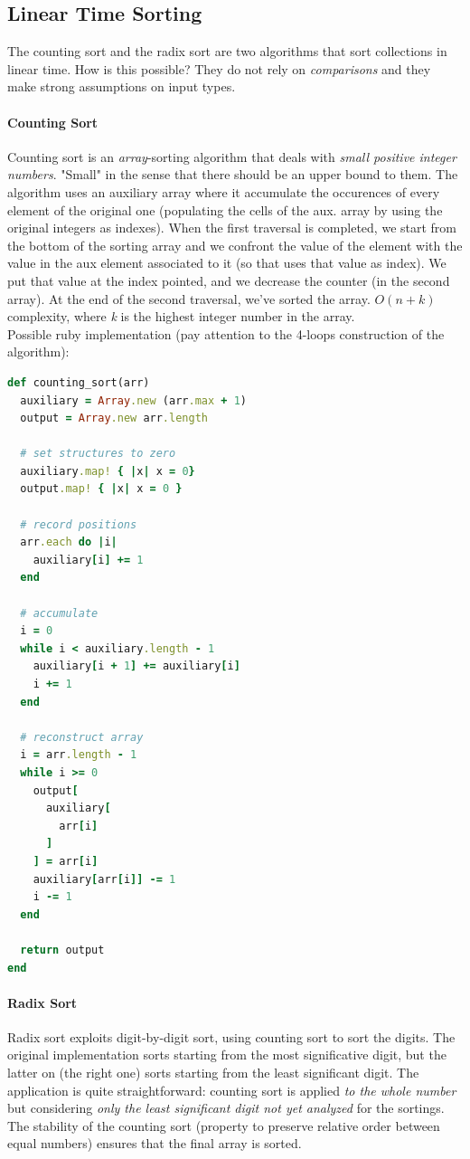 \documentclass{article}
\begin{document}
		\subsection{Linear Time Sorting}
			The counting sort and the radix sort are two algorithms that sort collections in linear time. How is this possible? They do not rely on \textit{comparisons} and they make strong assumptions on input types.

			\paragraph{Counting Sort}
				Counting sort is an \textit{array}-sorting algorithm that deals with \textit{small positive integer numbers}. "Small" in the sense that there should be an upper bound to them. The algorithm uses an auxiliary array where it accumulate the occurences of every element of the original one (populating the cells of the aux. array by using the original integers as indexes). When the first traversal is completed, we start from the bottom of the sorting array and we confront the value of the element with the value in the aux element associated to it (so that uses that value as index). We put that value at the index pointed, and we decrease the counter (in the second array). At the end of the second traversal, we've sorted the array. $O(n + k)$ complexity, where \emph{k} is the highest integer number in the array.\\
				Possible ruby implementation (pay attention to the 4-loops construction of the algorithm):
				\begin{lstlisting}[language=Ruby]
def counting_sort(arr)
  auxiliary = Array.new (arr.max + 1)
  output = Array.new arr.length

  # set structures to zero
  auxiliary.map! { |x| x = 0}
  output.map! { |x| x = 0 }

  # record positions
  arr.each do |i|
    auxiliary[i] += 1
  end

  # accumulate
  i = 0
  while i < auxiliary.length - 1
    auxiliary[i + 1] += auxiliary[i]
    i += 1
  end

  # reconstruct array
  i = arr.length - 1
  while i >= 0
    output[
      auxiliary[
        arr[i]
      ]
    ] = arr[i]
    auxiliary[arr[i]] -= 1
    i -= 1
  end

  return output
end
				\end{lstlisting}

			\paragraph{Radix Sort}
				Radix sort exploits digit-by-digit sort, using counting sort to sort the digits. The original implementation sorts starting from the most significative digit, but the latter on (the right one) sorts starting from the least significant digit. The application is quite straightforward: counting sort is applied \textit{to the whole number} but considering \textit{only the least significant digit not yet analyzed} for the sortings. The stability of the counting sort (property to preserve relative order between equal numbers) ensures that the final array is sorted.
\end{document}
